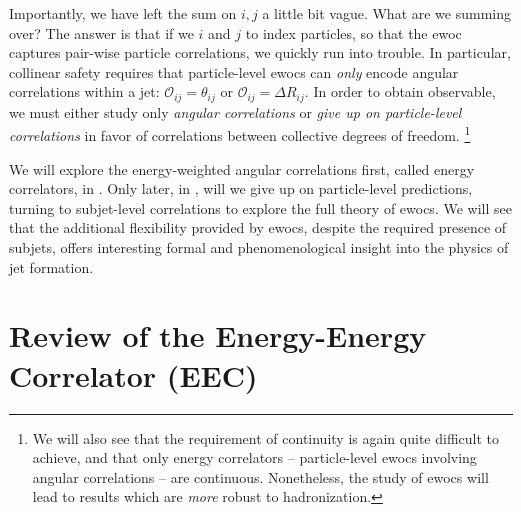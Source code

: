Importantly, we have left the sum on \(i,j\) a little bit vague.
%
What are we summing over?
%
The answer is that if we \(i\) and \(j\) to index particles, so that the \gls{ewoc} captures pair-wise particle correlations, we quickly run into trouble.
%
In particular, collinear safety requires that particle-level \glspl{ewoc} can \textit{only} encode angular correlations within a jet:
%
\(\mathcal{O}_{ij} = \theta_{ij}\) or \(\mathcal{O}_{ij} = \Delta R_{ij}\).
%
In order to obtain  observable, we must either study only \textit{angular correlations} or \textit{give up on particle-level correlations} in favor of correlations between collective degrees of freedom.%
\footnote{
    We will also see that the requirement of \gls{continuity} is again quite difficult to achieve, and that only energy correlators -- particle-level \glspl{ewoc} involving angular correlations -- are continuous.
    Nonetheless, the study of \glspl{ewoc} will lead to results which are \textit{more} robust to hadronization.
}


We will explore the energy-weighted angular correlations first, called energy correlators, in .
%
Only later, in , will we give up on particle-level predictions, turning to subjet-level correlations to explore the full theory of \glspl{ewoc}.
%
We will see that the additional flexibility provided by \glspl{ewoc}, despite the required presence of subjets, offers interesting formal and phenomenological insight into the physics of jet formation.




\section{Review of the Energy-Energy Correlator (EEC)}
\label{sec:eec}


